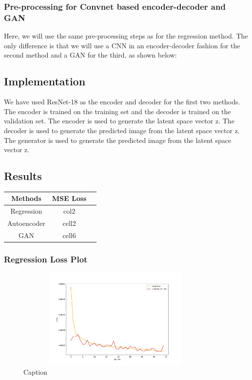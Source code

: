\documentclass{article}
\begin{document}
\subsubsection{Pre-processing for Convnet based encoder-decoder and GAN}
Here, we will use the same pre-processing steps as for the regression method. 
The only difference is that we will use a CNN in an encoder-decoder fashion for the second method and a GAN for the third, as shown below:

\subsection{Implementation}
We have used ResNet-18 as the encoder and decoder for the first two methods. 
The encoder is trained on the training set and the decoder is trained on the validation set.
The encoder is used to generate the latent space vector z.
The decoder is used to generate the predicted image from the latent space vector z.
The generator is used to generate the predicted image from the latent space vector z.

\subsection{Results}

\begin{center}
\begin{tabular}{ |c |c|c| } 
\hline
\textbf{Methods} & \textbf{MSE Loss}\\
\hline
Regression & col2 \\
\hline
Autoencoder & cell2   \\ 
\hline
GAN & cell6  \\ 
\hline
\end{tabular}
\end{center}

\pagebreak

\subsubsection{Regression Loss Plot}

\begin{figure}[htbp!]
\begin{center}
    \includegraphics[width=10cm, height=5cm]{regression-plot.jpg}
    \caption{Caption}
\end{center}
\end{figure}
\end{document}

